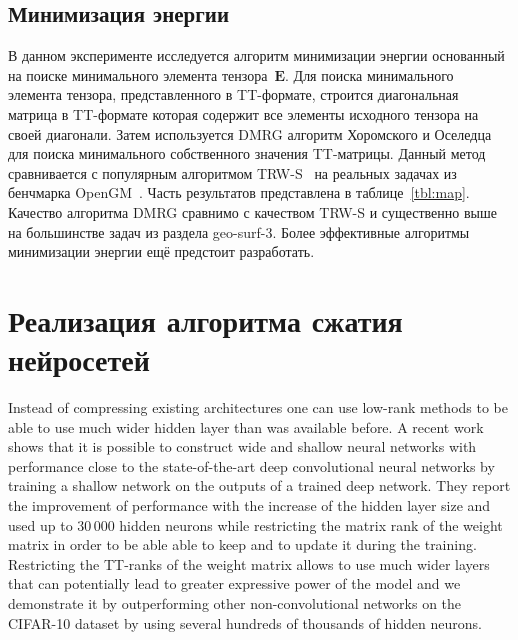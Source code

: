 \subsection{Минимизация энергии}
В данном эксперименте исследуется алгоритм минимизации энергии основанный на поиске минимального элемента тензора~$\mathbf{E}$. Для поиска минимального элемента тензора, представленного в TT\hyp{}формате, строится диагональная матрица в TT\hyp{}формате которая содержит все элементы исходного тензора на своей диагонали. Затем используется DMRG алгоритм Хоромского и Оселедца~\cite{khoromskij2010dmrg} для поиска минимального собственного значения TT\hyp{}матрицы. Данный метод сравнивается с популярным алгоритмом TRW-S~\cite{kolmogorov06trws} на реальных задачах из бенчмарка OpenGM~\cite{Kappes13comparison}. Часть результатов представлена в таблице~\ref{tbl:map}. Качество алгоритма DMRG сравнимо с качеством TRW-S и существенно выше на большинстве задач из раздела geo-surf-3. Более эффективные алгоритмы минимизации энергии ещё предстоит разработать.

\section{Реализация алгоритма сжатия нейросетей} \label{sec:exm-code}
Instead of compressing existing architectures one can use low-rank methods to be able to use much wider hidden layer than was available before. A recent work \cite{Jimmy2014lowRankSNN} shows that it is possible to construct wide and shallow neural networks with performance close to the state-of-the-art deep convolutional neural networks by training a shallow network on the outputs of a trained deep network. They report the improvement of performance with the increase of the hidden layer size and used up to $30\,000$ hidden neurons while restricting the matrix rank of the weight matrix in order to be able able to keep and to update it during the training. Restricting the TT-ranks of the weight matrix allows to use much wider layers that can potentially lead to greater expressive power of the model and we demonstrate it by outperforming other non-convolutional networks on the CIFAR-10 dataset by using several hundreds of thousands of hidden neurons.

